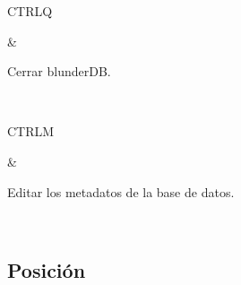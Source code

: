 \documentclass[letterpaper,10pt,spanish]{sphinxmanual}
\begin{document}
\begin{savenotes}
\begin{tabular}[t]{}
\sphinxhline\begin{varwidth}[t]{}
\sphinxAtStartPar
CTRL\sphinxhyphen{}Q
\sphinxbeforeendvarwidth
\end{varwidth}%
&\begin{varwidth}[t]{}
\sphinxAtStartPar
Cerrar blunderDB.
\sphinxbeforeendvarwidth
\end{varwidth}%
\\
\sphinxhline\begin{varwidth}[t]{}
\sphinxAtStartPar
CTRL\sphinxhyphen{}M
\sphinxbeforeendvarwidth
\end{varwidth}%
&\begin{varwidth}[t]{}
\sphinxAtStartPar
Editar los metadatos de la base de datos.
\sphinxbeforeendvarwidth
\end{varwidth}%
\\
\sphinxbottomrule
\end{tabular}
\sphinxtableafterendhook\par
\sphinxattableend\end{savenotes}


\subsection{Posición}
\label{\detokenize{raccourcis:position}}\label{\detokenize{raccourcis:raccourcis-position}}
\end{document}

